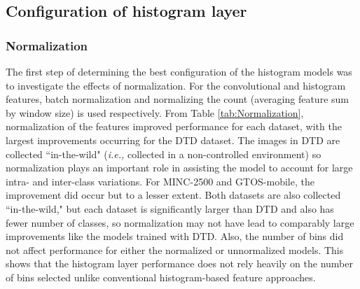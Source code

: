 \documentclass[journal]{IEEEtai}
\begin{document}
	\subsection{Configuration of histogram layer}
	\subsubsection{Normalization} The first step of determining the best configuration of the histogram models was to investigate the effects of normalization. For the convolutional and histogram features, batch normalization and normalizing the count (averaging feature sum by window size) is used respectively. From Table \ref{tab:Normalization}, normalization of the features improved performance for each dataset, with the largest improvements occurring for the DTD dataset. The images in DTD are collected ``in-the-wild" (\textit{i.e.,} collected in a non-controlled environment) so normalization plays an important role in assisting the model to account for large intra- and inter-class variations. For MINC-2500 and GTOS-mobile, the improvement did occur but to a lesser extent. Both datasets are also collected ``in-the-wild," but each dataset is significantly larger than DTD and also has fewer number of classes, so normalization may not have lead to comparably large improvements like the models trained with DTD. Also, the number of bins did not affect performance for either the normalized or unnormalized models. This shows that the histogram layer performance does not rely heavily on the number of bins selected unlike conventional histogram-based feature approaches.
\end{document}
